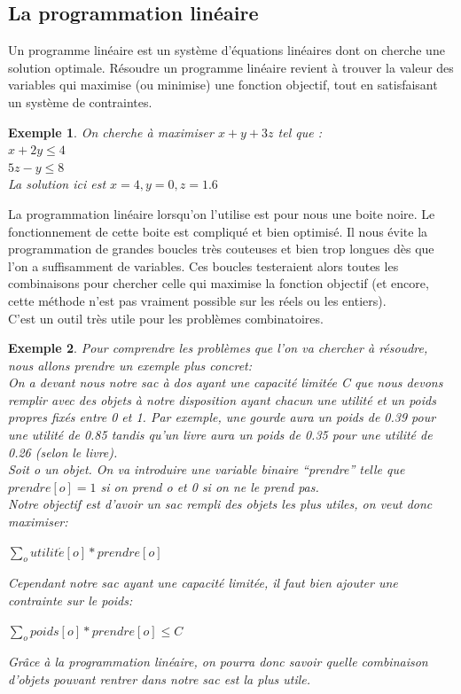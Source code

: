 \documentclass[a4paper]{article}
\newtheorem{Ex}{Exemple}[subsection]
\begin{document}
\subsection{La programmation linéaire}
  Un programme linéaire est un système d’équations linéaires dont on cherche une solution optimale. Résoudre un programme linéaire revient à trouver la valeur des variables qui maximise (ou minimise) une fonction objectif, tout en satisfaisant un système de contraintes.
\vspace{1\baselineskip}
\begin{Ex}
  On cherche à maximiser $x + y + 3z$ tel que : \\
  $x + 2y \leq 4$\\
  $5z - y \leq 8$\\
  La solution ici est $x = 4, y = 0, z = 1.6$
\end{Ex}
\vspace{1\baselineskip}
La programmation linéaire lorsqu'on l'utilise est pour nous une boite noire. Le fonctionnement de cette boite est compliqué et bien optimisé. Il nous évite la programmation de grandes boucles très couteuses et bien trop longues dès que l'on a suffisamment de variables. Ces boucles testeraient alors toutes les combinaisons pour chercher celle qui maximise la fonction objectif (et encore, cette méthode n'est pas vraiment possible sur les réels ou les entiers).\\
C'est un outil très utile pour les problèmes combinatoires.
\vspace{1\baselineskip}
\begin{Ex}
  Pour comprendre les problèmes que l'on va chercher à résoudre, nous allons prendre un exemple plus concret:\vspace{1\baselineskip} \\
  On a devant nous notre sac à dos ayant une capacité limitée C que nous devons remplir avec des objets à notre disposition ayant chacun une utilité et un poids propres fixés entre 0 et 1. Par exemple, une gourde aura un poids de 0.39 pour une utilité de 0.85 tandis qu'un livre aura un poids de 0.35 pour une utilité de 0.26 (selon le livre).\vspace{1\baselineskip}\\
  Soit o un objet. On va introduire une variable binaire ``prendre'' telle que $prendre[o]=1$ si on prend o et 0 si on ne le prend pas. \\
  Notre objectif est d'avoir un sac rempli des objets les plus utiles, on veut donc maximiser:
  \begin{center}
    $\sum_o utilit\acute{e}[o] * prendre[o]$
  \end{center}
  Cependant notre sac ayant une capacité limitée, il faut bien ajouter une contrainte sur le poids:
  \begin{center}
    $\sum_o poids[o] * prendre[o] \leq C$
  \end{center}
  Grâce à la programmation linéaire, on pourra donc savoir quelle combinaison d'objets pouvant rentrer dans notre sac est la plus utile.
  \end{Ex}
\newpage
\end{document}
